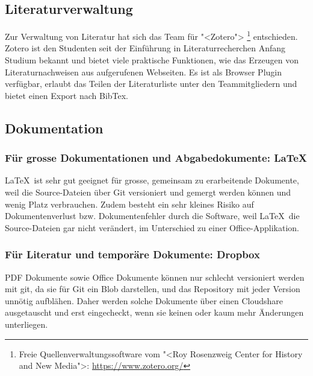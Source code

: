 				
		\subsection{Literaturverwaltung}
			Zur Verwaltung von Literatur hat sich das Team für "<Zotero"> \footnote{Freie Quellenverwaltungssoftware vom "<Roy Rosenzweig Center for History and New Media">: \url{https://www.zotero.org/}} entschieden.
			Zotero ist den Studenten seit der Einführung in Literaturrecherchen Anfang Studium bekannt und
			bietet viele praktische Funktionen, wie das Erzeugen von Literaturnachweisen aus aufgerufenen Webseiten.
			Es ist als Browser Plugin verfügbar, erlaubt das Teilen der Literaturliste unter den Teammitgliedern und bietet einen Export nach BibTex.
			

		\subsection{Dokumentation}
			\subsubsection{Für grosse Dokumentationen und Abgabedokumente: \LaTeX}
				\LaTeX\ ist sehr gut geeignet für grosse, gemeinsam zu erarbeitende Dokumente,
				weil die Source-Dateien über Git versioniert und gemergt werden können und wenig
				Platz verbrauchen. 
				Zudem besteht ein sehr kleines Risiko auf Dokumentenverlust
				bzw. Dokumentenfehler durch die Software, weil \LaTeX\ die Source-Dateien gar
				nicht verändert, im Unterschied zu einer Office-Applikation.
				
			\subsubsection{Für Literatur und temporäre Dokumente: Dropbox}
			PDF Dokumente sowie Office Dokumente können nur schlecht versioniert werden mit git, 
			da sie für Git ein Blob darstellen, und das Repository mit jeder Version unnötig aufblähen.
			Daher werden solche Dokumente über einen Cloudshare ausgetauscht und erst eingecheckt, 
			wenn sie keinen oder kaum mehr Änderungen unterliegen.
				
